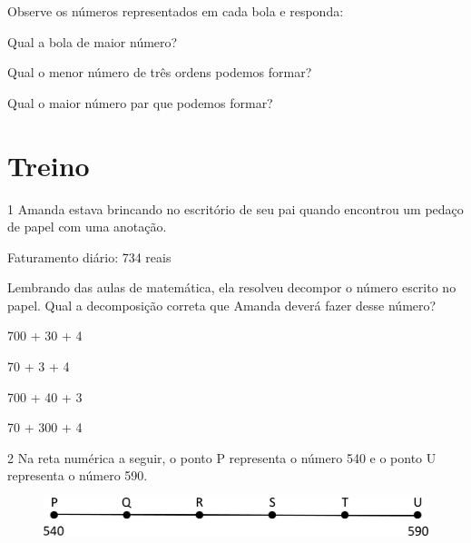 Observe os números representados em cada bola e responda:

\begin{escolha}
\item Qual a bola de maior número?

\item Qual o menor número de três ordens podemos formar?


\item Qual o maior número par que podemos formar?

\end{escolha}


\section*{Treino}

\num{1} Amanda estava brincando no escritório de seu pai quando
encontrou um pedaço de papel com uma anotação.

\begin{myquote}
Faturamento diário: 734 reais
\end{myquote}

Lembrando das aulas de matemática, ela resolveu decompor o número escrito
no papel. Qual a decomposição correta que Amanda deverá fazer desse
número?

\begin{escolha}
\item
  700 + 30 + 4
\item
  70 + 3 + 4
\item
  700 + 40 + 3
\item
  70 + 300 + 4
\end{escolha}

\num{2} Na reta numérica a seguir, o ponto P representa o número 540 e o ponto U representa o número 590.

\begin{figure}[htpb!]
\centering
\includegraphics[width=\textwidth]{./media/image8.png}
\end{figure}

